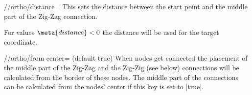 \begin{key}{/\tikzext/ortho/distance=}
  This sets the distance between the start point
  and the middle part of the Zig-Zag connection.
  
  For values $\meta{distance} < 0$ the distance will be used for the target coordinate.
\begin{codeexample}[width=8cm,preamble=\usetikzlibrary{ext.paths.ortho}]
\end{codeexample}
\end{key}
\begin{key}{/\tikzext/ortho/from center= (default true)}
  When nodes get connected the placement of the middle part of the Zig-Zag
  and the Zig-Zig (see below) connections will be calculated from the border
  of these nodes.
  The middle part of the connections can be calculated from the nodes' center
  if this key is set to |true|.
\end{key}

